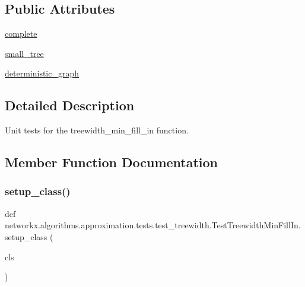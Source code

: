 \subsection*{Public Attributes}
\begin{DoxyCompactItemize}
\item 
\hyperlink{classnetworkx_1_1algorithms_1_1approximation_1_1tests_1_1test__treewidth_1_1TestTreewidthMinFillIn_ad28849cddc536fda1ba857de54a3606a}{complete}
\item 
\hyperlink{classnetworkx_1_1algorithms_1_1approximation_1_1tests_1_1test__treewidth_1_1TestTreewidthMinFillIn_a037e96db213390086f20d71ece8065e6}{small\+\_\+tree}
\item 
\hyperlink{classnetworkx_1_1algorithms_1_1approximation_1_1tests_1_1test__treewidth_1_1TestTreewidthMinFillIn_ad0d05fd36b4aa405aaa5394f9913e518}{deterministic\+\_\+graph}
\end{DoxyCompactItemize}


\subsection{Detailed Description}
\begin{DoxyVerb}Unit tests for the treewidth_min_fill_in function.\end{DoxyVerb}
 

\subsection{Member Function Documentation}
\mbox{\label{classnetworkx_1_1algorithms_1_1approximation_1_1tests_1_1test__treewidth_1_1TestTreewidthMinFillIn_a0755f58fcd7433ee35cf3a8b0fc74f11}} 
\subsubsection{\texorpdfstring{setup\+\_\+class()}{setup\_class()}}
{\footnotesize\ttfamily def networkx.\+algorithms.\+approximation.\+tests.\+test\+\_\+treewidth.\+Test\+Treewidth\+Min\+Fill\+In.\+setup\+\_\+class (\begin{DoxyParamCaption}\item[{}]{cls }\end{DoxyParamCaption})}

